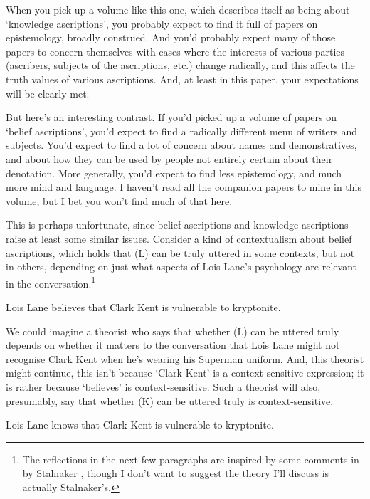When you pick up a volume like this one, which describes itself as being about `knowledge ascriptions', you probably expect to find it full of papers on epistemology, broadly construed. And you'd probably expect many of those papers to concern themselves with cases where the interests of various parties (ascribers, subjects of the ascriptions, etc.) change radically, and this affects the truth values of various ascriptions. And, at least in this paper, your expectations will be clearly met.

But here's an interesting contrast. If you'd picked up a volume of papers on `belief ascriptions', you'd expect to find a radically different menu of writers and subjects. You'd expect to find a lot of concern about names and demonstratives, and about how they can be used by people not entirely certain about their denotation. More generally, you'd expect to find less epistemology, and much more mind and language. I haven't read all the companion papers to mine in this volume, but I bet you won't find much of that here.

This is perhaps unfortunate, since belief ascriptions and knowledge ascriptions raise at least some similar issues. Consider a kind of contextualism about belief ascriptions, which holds that (L) can be truly uttered in some contexts, but not in others, depending on just what aspects of Lois Lane's psychology are relevant in the conversation.\footnote{The reflections in the next few paragraphs are inspired by some comments in by Stalnaker \citeyearpar{Stalnaker2008}, though I don't want to suggest the theory I'll discuss is actually Stalnaker's.}

\begin{enumerate*}
\setcounter{enumi}{11}
\renewcommand{\labelenumi}{(\Alph{enumi})}
\item Lois Lane believes that Clark Kent is vulnerable to kryptonite.
\end{enumerate*}

\noindent We could imagine a theorist who says that whether (L) can be uttered truly depends on whether it matters to the conversation that Lois Lane might not recognise Clark Kent when he's wearing his Superman uniform. And, this theorist might continue, this isn't because `Clark Kent' is a context-sensitive expression; it is rather because `believes' is context-sensitive.  Such a theorist will also, presumably, say that whether (K) can be uttered truly is context-sensitive.

\begin{enumerate*}
\setcounter{enumi}{10}
\renewcommand{\labelenumi}{(\Alph{enumi})}
\item Lois Lane knows that Clark Kent is vulnerable to kryptonite.
\end{enumerate*}

